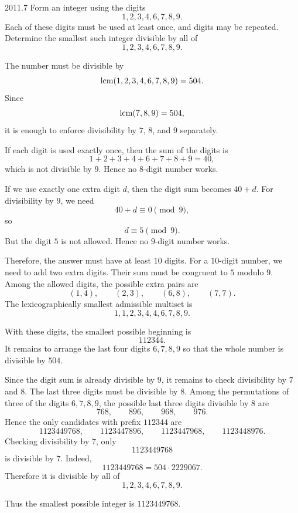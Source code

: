     \begin{pastproblem}{2011.7}
        Form an integer using the digits
        \[
            1,2,3,4,6,7,8,9.
        \]
        Each of these digits must be used at least once, and digits may be repeated. Determine the
        smallest such integer divisible by all of
        \[
            1,2,3,4,6,7,8,9.
        \]
    \end{pastproblem}

    \begin{solution}
        The number must be divisible by
        \[
            \operatorname{lcm}(1,2,3,4,6,7,8,9)=504.
        \]
        Since
        \[
            \operatorname{lcm}(7,8,9)=504,
        \]
        it is enough to enforce divisibility by $7$, $8$, and $9$ separately.

        If each digit is used exactly once, then the sum of the digits is
        \[
            1+2+3+4+6+7+8+9=40,
        \]
        which is not divisible by $9$. Hence no $8$-digit number works.

        If we use exactly one extra digit $d$, then the digit sum becomes $40+d$. For divisibility
        by $9$, we need
        \[
            40+d\equiv 0\pmod{9},
        \]
        so
        \[
            d\equiv 5\pmod{9}.
        \]
        But the digit $5$ is not allowed. Hence no $9$-digit number works.

        Therefore, the answer must have at least $10$ digits. For a $10$-digit number, we need to
        add two extra digits. Their sum must be congruent to $5$ modulo $9$. Among the allowed
        digits, the possible extra pairs are
        \[
            (1,4),\qquad (2,3),\qquad (6,8),\qquad (7,7).
        \]
        The lexicographically smallest admissible multiset is
        \[
            1,1,2,3,4,4,6,7,8,9.
        \]

        With these digits, the smallest possible beginning is
        \[
            112344.
        \]
        It remains to arrange the last four digits $6,7,8,9$ so that the whole number is divisible
        by $504$.

        Since the digit sum is already divisible by $9$, it remains to check divisibility by $7$ and
        $8$. The last three digits must be divisible by $8$. Among the permutations of three of the
        digits $6,7,8,9$, the possible last three digits divisible by $8$ are
        \[
            768,\qquad 896,\qquad 968,\qquad 976.
        \]
        Hence the only candidates with prefix $112344$ are
        \[
            1123449768,\qquad
            1123447896,\qquad
            1123447968,\qquad
            1123448976.
        \]
        Checking divisibility by $7$, only
        \[
            1123449768
        \]
        is divisible by $7$. Indeed,
        \[
            1123449768=504\cdot 2229067.
        \]
        Therefore it is divisible by all of
        \[
            1,2,3,4,6,7,8,9.
        \]

        Thus the smallest possible integer is $\boxed{1123449768}$.
    \end{solution}

